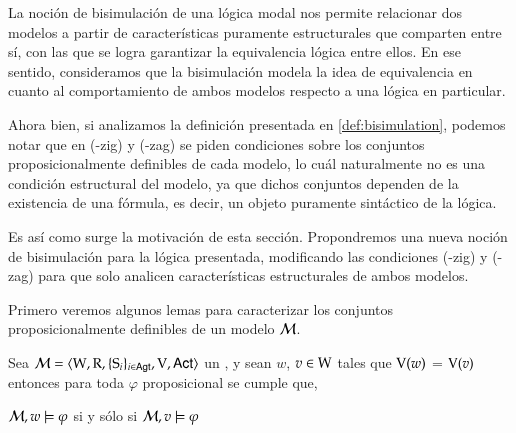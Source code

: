 La noción de bisimulación de una lógica modal nos permite relacionar dos modelos a partir de características puramente estructurales 
que comparten entre sí, con las que se logra garantizar la equivalencia lógica entre ellos. En ese sentido, consideramos que la 
bisimulación modela la idea de equivalencia en cuanto al comportamiento de ambos modelos respecto a una lógica en particular.

Ahora bien, si analizamos la definición presentada en \ref{def:bisimulation}, podemos notar que en (\KHilogic-zig) y (\KHilogic-zag) se piden condiciones 
sobre los conjuntos proposicionalmente definibles de cada modelo, lo cuál naturalmente no es una condición estructural del modelo, 
ya que dichos conjuntos dependen de la existencia de una fórmula, es decir, un objeto puramente sintáctico de la lógica. 

Es así como surge la motivación de esta sección. Propondremos una nueva noción de bisimulación para la lógica presentada, modificando las condiciones
(\KHilogic-zig) y (\KHilogic-zag) para que solo analicen características estructurales de ambos modelos.

Primero veremos algunos lemas para caracterizar los conjuntos proposicionalmente definibles de un modelo $\mathcal{M}$.

\begin{lema}\label{ref:propositional-equivalence}
    Sea $\mathcal{M}=\langle \mathrm{W},\mathrm{R},\{ \mathrm{S}_i \}_{i \in {\rm \sf Agt}},\mathrm{V},{\rm \sf Act} \rangle$ un \ults, y sean $w$, $v \in \mathrm{W}$
    tales que $\mathrm{V}(w)$ = $\mathrm{V}(v)$ entonces para toda $\varphi$ proposicional se cumple que, 
    \begin{center}
    $\mathcal{M}, w \models \varphi$ \quad si y sólo si \quad $ 
    \mathcal{M}, v \models \varphi$
    \end{center}
\end{lema}

